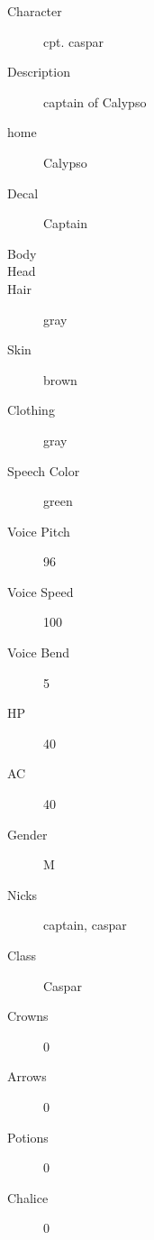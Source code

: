 \documentclass[11pt,letterpaper,oldstylefigures]{memoir}
\begin{document}
\begin{description}
\item[Character] cpt. caspar
\item[Description] captain of Calypso
\item[home] Calypso
\item[Decal] Captain
\item[Body]
\item[Head]
\item[Hair] gray
\item[Skin] brown
\item[Clothing] gray
\item[Speech Color] green
\item[Voice Pitch] 96
\item[Voice Speed] 100
\item[Voice Bend] 5
\item[HP] 40
\item[AC] 40
\item[Gender] M
\item[Nicks] captain, caspar
\item[Class] Caspar
\item[Crowns] 0
\item[Arrows] 0
\item[Potions] 0
\item[Chalice] 0
\end{description}
\end{document}
